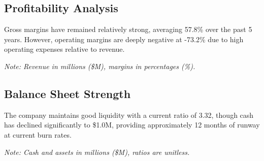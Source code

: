 \documentclass[11pt,a4paper]{article}
\begin{document}
\subsection{Profitability Analysis}

Gross margins have remained relatively strong, averaging 57.8\% over the past 5 years. However, operating margins are deeply negative at -73.2\% due to high operating expenses relative to revenue.

\small{\textit{Note: Revenue in millions (\$M), margins in percentages (\%).}}


\begin{table}[H]
\centering
\caption{Profitability Margins (Recent 8 Years)}
\label{tab:profitability}
\end{table}

\subsection{Balance Sheet Strength}

The company maintains good liquidity with a current ratio of 3.32, though cash has declined significantly to \$1.0M, providing approximately 12 months of runway at current burn rates.

\small{\textit{Note: Cash and assets in millions (\$M), ratios are unitless.}}
\end{document}

